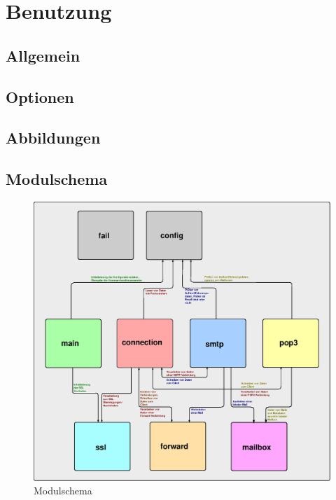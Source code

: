 \documentclass[final,a4paper,11pt,notitlepage,halfparskip]{scrreprt}
\begin{document}
\chapter{Benutzung}

\section{Allgemein}
\section{Optionen}

\pagebreak

\begin{appendix}
  \chapter{Abbildungen}
  \section{Modulschema}
  \begin{figure}[htb]
    \includegraphics[width=\textwidth]{schema.eps}
    \caption{Modulschema}
    \label{fig:schema}
  \end{figure}
\end{appendix}
\end{document}
